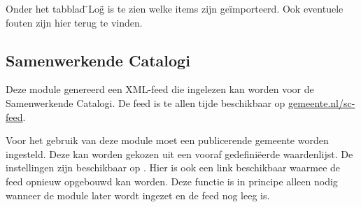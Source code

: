 Onder het tabblad \"{ }Log\"{ } is te zien welke items zijn ge\"{i}mporteerd. Ook eventuele fouten zijn hier terug te vinden.

\subsection{Samenwerkende Catalogi}

Deze module genereerd een XML-feed die ingelezen kan worden voor de Samenwerkende Catalogi. De feed is te allen tijde beschikbaar op \url{gemeente.nl/sc-feed}.

Voor het gebruik van deze module moet een publicerende gemeente worden ingesteld. Deze kan worden gekozen uit een vooraf gedefini\"{e}erde waardenlijst. De instellingen zijn beschikbaar op . Hier is ook een link beschikbaar waarmee de feed opnieuw opgebouwd kan worden. Deze functie is in principe alleen nodig wanneer de module later wordt ingezet en de feed nog leeg is.
